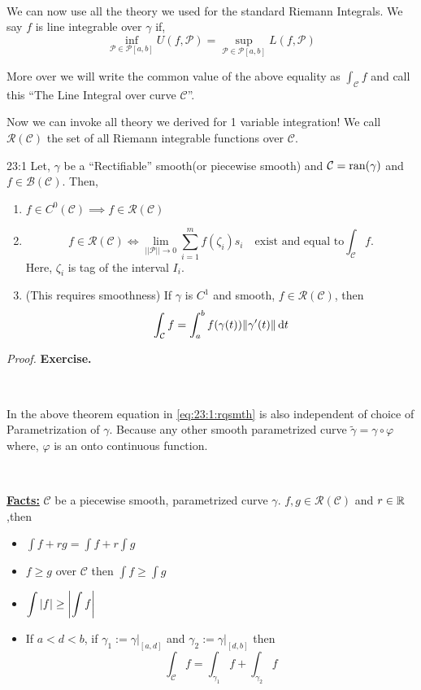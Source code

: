 \documentclass[../Analysis-3.tex]{subfiles}
\begin{document}
\

We can now use all the theory we used for the standard Riemann Integrals. We say $f$ is line integrable over $\gamma$ if,
\[\inf_{\mathcal{P} \in \mathscr{P}[a,b]} U(f,\mathcal{P}) = \sup_{\mathcal{P} \in \mathscr{P}[a,b]} L(f,\mathcal{P})\]

More over we will write the common value of the above equality as $\displaystyle\int_{\mathcal{C}} f$ and call this ``The Line Integral over curve $\mathcal{C}$''.

Now we can invoke all theory we derived for 1 variable integration! We call $\mathscr{R}(\mathcal{C}) $ the set of all Riemann integrable functions over $\mathcal{C}$.

\begin{Thm}{}{23:1}
  Let, $\gamma$ be a ``Rectifiable'' smooth(or piecewise smooth) and $\mathcal{C} = \operatorname{ran}(\gamma)$ and $f \in \mathscr{B}(\mathcal{C})$. Then,
  \begin{enumerate}
    \item $f \in C^0(\mathcal{C}) \implies f \in \mathscr{R}(\mathcal{C})$
    \item \[ f \in \mathscr{R}(\mathcal{C}) \iff \lim_{||\mathcal{P}||\to 0} \sum_{i=1}^{m} f(\zeta_i)s_i \quad \text{exist and equal to}\int_{\mathcal{C}} f.\] Here, $\zeta_i$ is tag of the interval $I_i$.

    \item (This requires smoothness) If $\gamma$ is $C^1$ and smooth, $f \in \mathscr{R}(\mathcal{C})$, then
          \[\int_{\mathcal{C}} f = \int_a^b f(\gamma(t))\norm{\gamma'(t)} \, \dd t \label{eq:23:1:rqsmth}\]

  \end{enumerate}
\end{Thm}

\textit{Proof.} \textbf{Exercise.}

\

In the above theorem equation in \ref{eq:23:1:rqsmth} is also independent of choice of Parametrization of $\gamma$. Because any other smooth parametrized curve $\tilde{\gamma} = \gamma \circ \varphi$ where, $\varphi$ is an onto continuous function.

\

\textbf{\underline{Facts:}} $\mathcal{C}$ be a piecewise smooth, parametrized curve $\gamma$. $f,g \in \mathscr{R}(\mathcal{C})$ and $r \in \mathbb{R}$,then
\begin{itemize}
  \item $\displaystyle\int f+rg = \displaystyle\int f + r\displaystyle\int g $
  \item $f \ge g$ over $\mathcal{C}$ then $\displaystyle\int f \ge \displaystyle\int g$
  \item $\displaystyle\int \abs{f} \ge \abs{\displaystyle\int f}$
  \item If $a<d<b$, if $\gamma_1 := \gamma |_{[a,d]}$ and $\gamma_2 := \gamma |_{[d,b]}$ then
        \[\int_{\mathcal{C}} f = \int_{\gamma_1}f + \int_{\gamma_2} f \]
\end{itemize}
\end{document}
